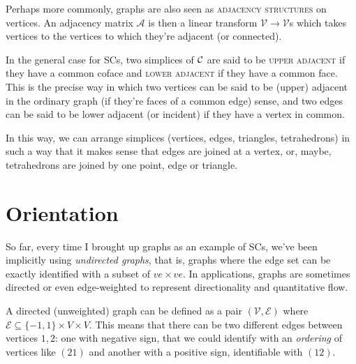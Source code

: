 \documentclass{tufte-handout}
\newcommand{\define}{\textsc}
\newcommand{\ve}{\mathcal{V}}
\begin{document}
Perhaps more commonly, graphs are also seen as \define{adjacency structures} on vertices. An adjacency matrix $\mathcal A$ is then a linear transform $\ve\to \ve$s which takes vertices to the vertices to which they're adjacent (or connected). 


In the general case for SCs, two simplices of $\sc$ are said to be \define{upper adjacent} if they have a common coface and \define{lower adjacent} if they have a common face. This is the precise way in which two vertices can be said to be (upper) adjacent in the ordinary graph (if they're faces of a common edge) sense, and two edges can be said to be lower adjacent (or incident) if they have a vertex in common.

In this way, we can arrange simplices (vertices, edges, triangles, tetrahedrons) in such a way that it makes sense that edges are joined at a vertex, or, maybe, tetrahedrons are joined by one point, edge or triangle. 
\section{Orientation}

So far, every time I brought up graphs as an example of SCs, we've been implicitly using \emph{undirected graphs}, that is, graphs where the edge set can be exactly identified with a subset of $ve\times ve$. In applications, graphs are sometimes directed or even edge-weighted to represent directionality and quantitative flow. 

A directed (unweighted) graph can be defined as a pair $(\ve, \mathcal E)$ where $\mathcal E \subseteq \{-1,1\}\times V\times V$. This means that there can be two different edges between vertices $1,2$: one with negative sign, that we could identify with an \emph{ordering} of vertices like $(21)$ and another with a positive sign, identifiable with  $(12)$.
\end{document}
